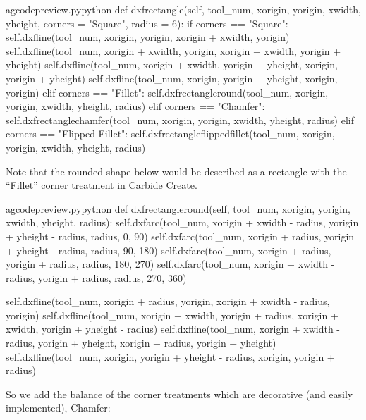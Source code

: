 \documentclass{ltxdoc}
\begin{document}
\lstset{firstnumber=\thegcpy}
\begin{writecode}{a}{gcodepreview.py}{python}
    def dxfrectangle(self, tool_num, xorigin, yorigin, xwidth, yheight, corners = "Square", radius = 6):
        if corners == "Square":
            self.dxfline(tool_num, xorigin, yorigin, xorigin + xwidth, yorigin)
            self.dxfline(tool_num, xorigin + xwidth, yorigin, xorigin + xwidth, yorigin + yheight)
            self.dxfline(tool_num, xorigin + xwidth, yorigin + yheight, xorigin, yorigin + yheight)
            self.dxfline(tool_num, xorigin, yorigin + yheight, xorigin, yorigin)
        elif corners == "Fillet":
            self.dxfrectangleround(tool_num, xorigin, yorigin, xwidth, yheight, radius)
        elif corners == "Chamfer":
            self.dxfrectanglechamfer(tool_num, xorigin, yorigin, xwidth, yheight, radius)
        elif corners == "Flipped Fillet":
            self.dxfrectangleflippedfillet(tool_num, xorigin, yorigin, xwidth, yheight, radius)

\end{writecode}
\addtocounter{gcpy}{6}

Note that the rounded shape below would be described as a rectangle with the ``Fillet'' corner treatment in Carbide Create.

\lstset{firstnumber=\thegcpy}
\begin{writecode}{a}{gcodepreview.py}{python}
    def dxfrectangleround(self, tool_num, xorigin, yorigin, xwidth, yheight, radius):
        self.dxfarc(tool_num, xorigin + xwidth - radius, yorigin + yheight - radius, radius,   0,  90)
        self.dxfarc(tool_num, xorigin + radius, yorigin + yheight - radius, radius,  90, 180)
        self.dxfarc(tool_num, xorigin + radius, yorigin + radius, radius, 180, 270)
        self.dxfarc(tool_num, xorigin + xwidth - radius, yorigin + radius, radius, 270, 360)

        self.dxfline(tool_num, xorigin + radius, yorigin, xorigin + xwidth - radius, yorigin)
        self.dxfline(tool_num, xorigin + xwidth, yorigin + radius, xorigin + xwidth, yorigin + yheight - radius)
        self.dxfline(tool_num, xorigin + xwidth - radius, yorigin + yheight, xorigin + radius, yorigin + yheight)
        self.dxfline(tool_num, xorigin, yorigin + yheight - radius, xorigin, yorigin + radius)

\end{writecode}
\addtocounter{gcpy}{11}

So we add the balance of the corner treatments which are decorative (and easily implemented), Chamfer:
\end{document}
